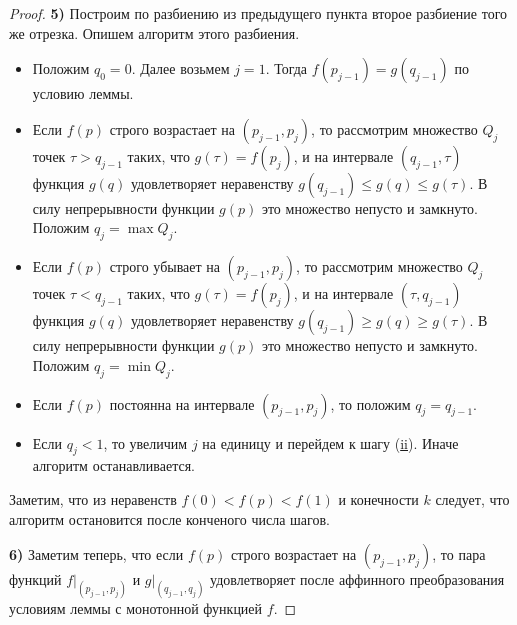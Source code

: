 \begin{proof}
\smallskip



{\bf 5)} Построим по разбиению из предыдущего пункта второе разбиение того же отрезка. Опишем алгоритм этого разбиения.

\begin{itemize}

\item[(i)] Положим $q_0=0$. Далее возьмем $j=1$. Тогда $f(p_{j-1})=g(q_{j-1})$ по условию леммы.

\item[(ii)] \hypertarget{palin:step2}{} Если $f(p)$ строго возрастает на $(p_{j-1},p_j)$, то рассмотрим множество $Q_{j}$ точек $\tau>q_{j-1}$ таких, что $g(\tau)=f(p_j)$, и на интервале $(q_{j-1},\tau)$ функция $g(q)$ удовлетворяет неравенству $g(q_{j-1})\le g(q)\le g(\tau)$. В силу непрерывности функции $g(p)$ это множество непусто и замкнуто. Положим $q_j=\max Q_j$.

\item[(iii)]

Если $f(p)$ строго убывает на $(p_{j-1},p_j)$, то рассмотрим множество $Q_{j}$ точек $\tau<q_{j-1}$ таких, что $g(\tau)=f(p_j)$, и на интервале $(\tau,q_{j-1})$ функция $g(q)$ удовлетворяет неравенству $g(q_{j-1})\ge g(q)\ge g(\tau)$. В силу непрерывности функции $g(p)$ это множество непусто и замкнуто. Положим $q_j=\min Q_j$.

\item[(iv)]

Если $f(p)$ постоянна на интервале $(p_{j-1},p_j)$, то положим $q_j=q_{j-1}$.

\item[(v)]

 Если $q_j<1$, то увеличим $j$ на единицу и перейдем к шагу (\hyperlink{palin:step2}{ii}). Иначе алгоритм останавливается.



\end{itemize}



Заметим, что из неравенств $f(0)<f(p)<f(1)$ и конечности $k$ следует, что алгоритм остановится после конченого числа шагов.



\smallskip



{\bf 6)} Заметим теперь, что если $f(p)$ строго возрастает на $(p_{j-1},p_j)$, то пара функций $f|_{(p_{j-1},p_j)}$ и $g|_{(q_{j-1},q_j)}$ удовлетворяет после аффинного преобразования условиям леммы с монотонной функцией $f$. 


\end{proof}
